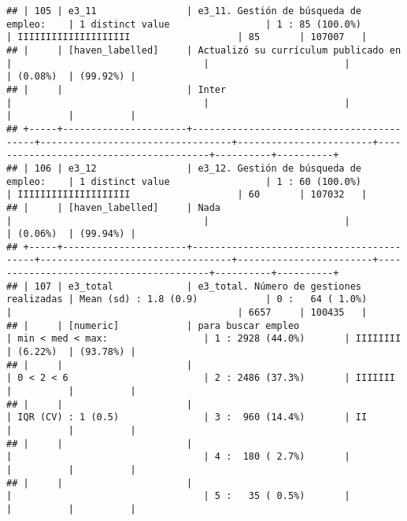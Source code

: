 \documentclass[]{article}
\begin{document}
\begin{verbatim}
## | 105 | e3_11                | e3_11. Gestión de búsqueda de empleo:    | 1 distinct value                 | 1 : 85 (100.0%)        | IIIIIIIIIIIIIIIIIIII                   | 85       | 107007   |
## |     | [haven_labelled]     | Actualizó su currículum publicado en     |                                  |                        |                                        | (0.08%)  | (99.92%) |
## |     |                      | Inter                                    |                                  |                        |                                        |          |          |
## +-----+----------------------+------------------------------------------+----------------------------------+------------------------+----------------------------------------+----------+----------+
## | 106 | e3_12                | e3_12. Gestión de búsqueda de empleo:    | 1 distinct value                 | 1 : 60 (100.0%)        | IIIIIIIIIIIIIIIIIIII                   | 60       | 107032   |
## |     | [haven_labelled]     | Nada                                     |                                  |                        |                                        | (0.06%)  | (99.94%) |
## +-----+----------------------+------------------------------------------+----------------------------------+------------------------+----------------------------------------+----------+----------+
## | 107 | e3_total             | e3_total. Número de gestiones realizadas | Mean (sd) : 1.8 (0.9)            | 0 :   64 ( 1.0%)       |                                        | 6657     | 100435   |
## |     | [numeric]            | para buscar empleo                       | min < med < max:                 | 1 : 2928 (44.0%)       | IIIIIIII                               | (6.22%)  | (93.78%) |
## |     |                      |                                          | 0 < 2 < 6                        | 2 : 2486 (37.3%)       | IIIIIII                                |          |          |
## |     |                      |                                          | IQR (CV) : 1 (0.5)               | 3 :  960 (14.4%)       | II                                     |          |          |
## |     |                      |                                          |                                  | 4 :  180 ( 2.7%)       |                                        |          |          |
## |     |                      |                                          |                                  | 5 :   35 ( 0.5%)       |                                        |          |          |

\end{verbatim}
\end{document}
